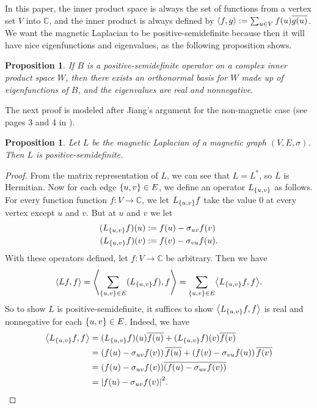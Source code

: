 \documentclass{article}
\newtheorem{prop}[thm]{Proposition}
\theoremstyle{definition}
\newcommand{\C}{\mathbb C}
\DeclarePairedDelimiter\abs{\lvert}{\rvert}
\DeclarePairedDelimiter\set{\{}{\}}
\DeclarePairedDelimiter\inner{\langle}{\rangle}
\begin{document}
In this paper, the inner product space is always the set of functions from a vertex set $V$ into $\C$, and the inner product is always defined by $\inner{f, g} := \sum_{u \in V} f(u) \overline{g(u)}$. We want the magnetic Laplacian to be positive-semidefinite because then it will have nice eigenfunctions and eigenvalues, as the following proposition shows.

\begin{prop}
    If $B$ is a positive-semidefinite operator on a complex inner product space $W$, then there exists an orthonormal basis for $W$ made up of eigenfunctions of $B$, and the eigenvalues are real and nonnegative.  
\end{prop}

The next proof is modeled after Jiang's argument for the non-magnetic case (see pages 3 and 4 in \cite{jiang}).

\begin{prop}\label{Laplacian is positive-semidefinite}
    Let $L$ be the magnetic Laplacian of a magnetic graph $(V, E, \sigma)$. Then $L$ is positive-semidefinite.
\end{prop}
\begin{proof}
    From the matrix representation of $L$, we can see that $L = L^*$, so $L$ is Hermitian. Now for each edge $\set{u, v} \in E$, we define an operator $L_{\set{u, v}}$ as follows. For every function function $f:V \rightarrow \C$, we let $L_{\set{u, v}} f$ take the value 0 at every vertex except $u$ and $v$. But at $u$ and $v$ we let 
    \begin{align*}
        (L_{\set{u, v}} f) (u) &:= f(u) - \sigma_{uv} f(v) \\
        (L_{\set{u, v}} f) (v) &:= f(v) - \sigma_{vu} f(u).
    \end{align*}
    With these operators defined, let $f: V \rightarrow \C$ be arbitrary. Then we have
    $$
    \inner{L f, f} 
    = \inner*{\sum_{\set*{u,v} \in E} (L_{\set{u, v}} f), f}
    = \sum_{\set*{u,v} \in E} \inner*{L_{\set{u, v}} f, f}.
    $$
    So to show $L$ is positive-semidefinite, it suffices to show $\inner*{L_{\set{u, v}} f, f}$ is real and nonnegative for each $\set*{u, v} \in E$. Indeed, we have
    \begin{align*}
        \inner*{L_{\set{u, v}} f, f}
        &= (L_{\set{u, v}} f)(u) \overline{f(u)} + (L_{\set{u, v}} f)(v) \overline{f(v)} \\
        &= \left( f(u) - \sigma_{uv} f(v) \right) \overline{f(u)} + \left( f(v) - \sigma_{vu} f(u) \right) \overline{f(v)} \\
        &= ( f(u) - \sigma_{uv} f(v) ) \overline{(f(u) - \sigma_{uv} f(v))} \\
        &= \abs*{f(u) - \sigma_{uv} f(v)}^2.
    \end{align*}
\end{proof}
\end{document}
